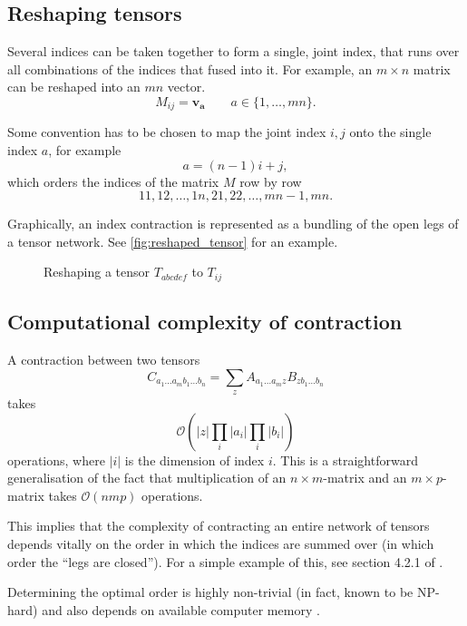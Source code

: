 \subsection{Reshaping tensors}
Several indices can be taken together to form a single, joint index, that runs over all
combinations of the indices that fused into it. For example, an $m \times n$ matrix can be
reshaped into an $m n$ vector.
\begin{equation}
  M_{i j} = \bm{v_a} \qquad a \in \{ 1, \dots, m n \}.
\end{equation}

Some convention has to be chosen to map the joint index $i, j$ onto the single index $a$,
for example
\begin{equation}
  a = (n - 1)i + j,
\end{equation}
which orders the indices of the matrix $M$ row by row
\begin{equation}
  1 1, 1 2, \dots, 1 n, 2 1, 2 2, \dots, m n - 1, m n.
\end{equation}

Graphically, an index contraction is represented as a bundling of the open legs of a
tensor network. See \autoref{fig:reshaped_tensor} for an example.

\begin{figure}
  
  \caption{Reshaping a tensor $T_{a b c d e f}$ to $T_{i j}$}
  \label{fig:reshaped_tensor}
\end{figure}

\subsection{Computational complexity of contraction}

A contraction between two tensors
\begin{equation}
  C_{a_1 \dots a_m b_1 \dots b_n} = \sum_{z} A_{a_1 \dots a_m z} B_{z b_1 \dots b_n}
\end{equation}
takes
\begin{equation}
  \mathcal{O} \left( |z| \prod_{i} |a_i| \prod_{i} |b_i| \right)
\end{equation}
operations, where $|i|$ is the dimension of index $i$.
This is a straightforward generalisation of the fact that multiplication of an $n \times m$-matrix and an $m \times
p$-matrix takes $\mathcal{O}(n m p)$ operations.

This implies that the complexity of contracting an entire network of tensors depends vitally on the order in which the
indices are summed over (in which order the \enquote{legs are closed}).
For a simple example of this, see section 4.2.1 of \cite{schollwock2011density}.

Determining the optimal order is highly non-trivial (in fact, known to be NP-hard) and also depends on available
computer memory \cite{pfeifer2014faster}.
